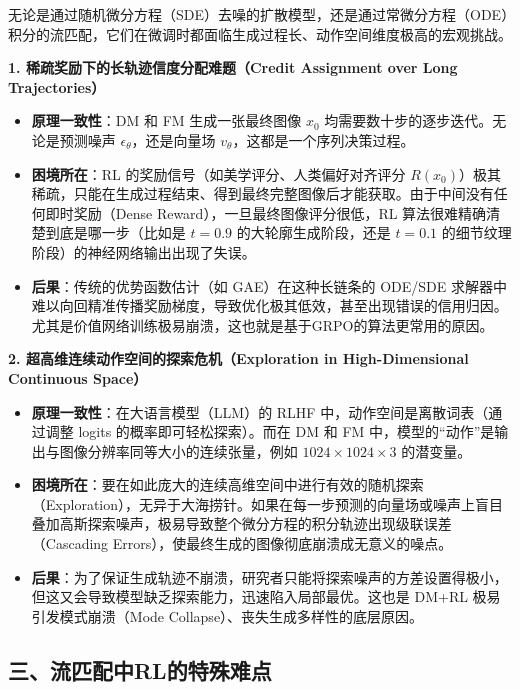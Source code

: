 无论是通过随机微分方程（SDE）去噪的扩散模型，还是通过常微分方程（ODE）积分的流匹配，它们在微调时都面临生成过程长、动作空间维度极高的宏观挑战。

\textbf{1. 稀疏奖励下的长轨迹信度分配难题（Credit Assignment over Long Trajectories）}

\begin{itemize}
\tightlist
\item
  \textbf{原理一致性}：DM 和 FM 生成一张最终图像 \(x_0\) 均需要数十步的逐步迭代。无论是预测噪声 \(\epsilon_\theta\)，还是向量场 \(v_\theta\)，这都是一个序列决策过程。
\item
  \textbf{困境所在}：RL 的奖励信号（如美学评分、人类偏好对齐评分 \(R(x_0)\)）极其稀疏，只能在生成过程结束、得到最终完整图像后才能获取。由于中间没有任何即时奖励（Dense Reward），一旦最终图像评分很低，RL 算法很难精确清楚到底是哪一步（比如是 \(t = 0.9\) 的大轮廓生成阶段，还是 \(t = 0.1\) 的细节纹理阶段）的神经网络输出出现了失误。
\item
  \textbf{后果}：传统的优势函数估计（如 GAE）在这种长链条的 ODE/SDE 求解器中难以向回精准传播奖励梯度，导致优化极其低效，甚至出现错误的信用归因。
  尤其是价值网络训练极易崩溃，这也就是基于GRPO的算法更常用的原因。
\end{itemize}

\textbf{2. 超高维连续动作空间的探索危机（Exploration in High-Dimensional Continuous Space）}

\begin{itemize}
\tightlist
\item
  \textbf{原理一致性}：在大语言模型（LLM）的 RLHF 中，动作空间是离散词表（通过调整 logits 的概率即可轻松探索）。而在 DM 和 FM 中，模型的``动作''是输出与图像分辨率同等大小的连续张量，例如 \(1024 \times 1024 \times 3\) 的潜变量。
\item
  \textbf{困境所在}：要在如此庞大的连续高维空间中进行有效的随机探索（Exploration），无异于大海捞针。如果在每一步预测的向量场或噪声上盲目叠加高斯探索噪声，极易导致整个微分方程的积分轨迹出现级联误差（Cascading Errors），使最终生成的图像彻底崩溃成无意义的噪点。
\item
  \textbf{后果}：为了保证生成轨迹不崩溃，研究者只能将探索噪声的方差设置得极小，但这又会导致模型缺乏探索能力，迅速陷入局部最优。这也是 DM+RL 极易引发模式崩溃（Mode Collapse）、丧失生成多样性的底层原因。
\end{itemize}

\hypertarget{ux4e09ux6d41ux5339ux914dux4e2drlux7684ux7279ux6b8aux96beux70b9}{%
\subsection{三、流匹配中RL的特殊难点}\label{ux4e09ux6d41ux5339ux914dux4e2drlux7684ux7279ux6b8aux96beux70b9}}

